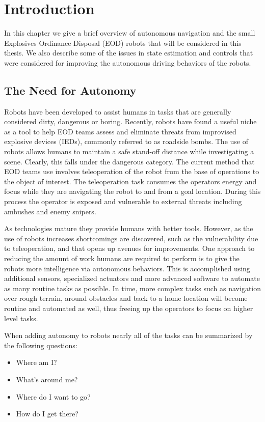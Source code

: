\chapter{Introduction}
\label{ch:introduction}
In this chapter we give a brief overview of autonomous navigation and the small Explosives Ordinance Disposal (EOD) robots that will be considered in this thesis. We also describe some of the issues in state estimation and controls that were considered for improving the autonomous driving behaviors of the robots.

\section{The Need for Autonomy}
\label{sec:needforautonomy}
Robots have been developed to assist humans in tasks that are generally considered dirty, dangerous or boring. Recently, robots have found a useful niche as a tool to help EOD teams assess and eliminate threats from improvised explosive devices (IEDs), commonly referred to as roadside bombs. The use of robots allows humans to maintain a safe stand-off distance while investigating a scene. Clearly, this falls under the dangerous category. The current method that EOD teams use involves teleoperation of the robot from the base of operations to the object of interest. The teleoperation task consumes the operators energy and focus while they are navigating the robot to and from a goal location. During this process the operator is exposed and vulnerable to external threats including ambushes and enemy snipers.

As technologies mature they provide humans with better tools. However, as the use of robots increases shortcomings are discovered, such as the vulnerability due to teleoperation, and that opens up avenues for improvements. One approach to reducing the amount of work humans are required to perform is to give the robots more intelligence via autonomous behaviors. This is accomplished using additional sensors, specialized actuators and more advanced software to automate as many routine tasks as possible. In time, more complex tasks such as navigation over rough terrain, around obstacles and back to a home location will become routine and automated as well, thus freeing up the operators to focus on higher level tasks.

When adding autonomy to robots nearly all of the tasks can be summarized by the following questions:
\begin{itemize}
\item Where am I?
\item What's around me?
\item Where do I want to go?
\item How do I get there?
\end{itemize}

